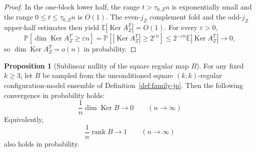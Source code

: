 \documentclass[11pt]{article}
\theoremstyle{definition}
\newtheorem{proposition}[theorem]{Proposition}
\newcommand{\EE}{\mathbb E}
\newcommand{\PP}{\mathbb P}
\newcommand{\rank}{\operatorname{rank}}
\newcommand{\Ker}{\operatorname{Ker}}
\begin{document}
\begin{proof}
In the one-block lower half, the range \(t>\tau_{0,Z}n\) is exponentially small and the range \(0\le t\le\tau_{0,Z}n\) is \(O(1)\). The even-\(j_Z\) complement fold and the odd-\(j_Z\) upper-half estimates then yield \(\EE|\Ker A_Z^T|=O(1)\). For every \(\varepsilon>0\),
\[
\PP[\dim\Ker A_Z^T\ge\varepsilon n]
=
\PP[|\Ker A_Z^T|\ge2^{\varepsilon n}]
\le
2^{-\varepsilon n}\EE|\Ker A_Z^T|
\to0,
\]
so \(\dim\Ker A_Z^T=o(n)\) in probability.
\end{proof}

\begin{proposition}[Sublinear nullity of the square regular map \(B\)]\label{prop:B-rank-jp}
For any fixed \(k\ge 3\), let \(B\) be sampled from the unconditioned square
\((k,k)\)-regular configuration-model ensemble of Definition~\ref{def:family-jp}. Then the
following convergence in probability holds:
\begin{equation*}
\frac1n \dim\Ker B \to 0
\qquad (n\to\infty)
\end{equation*}
Equivalently,
\begin{equation*}
\frac1n \rank B \to 1
\qquad (n\to\infty)
\end{equation*}
also holds in probability.
\end{proposition}
\end{document}
